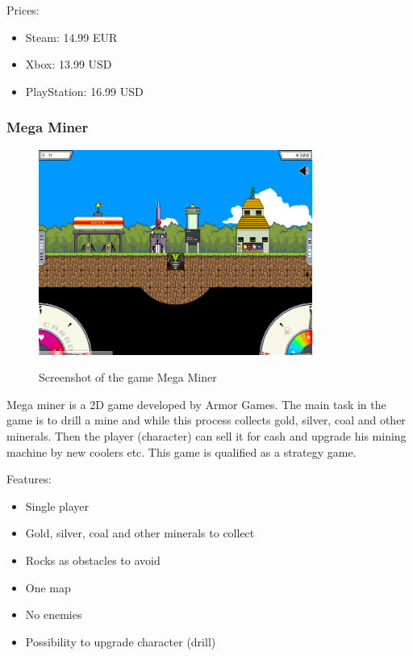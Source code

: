 \documentclass[12p]{article}
\begin{document}
Prices:

\begin{itemize}
  \item Steam: 14.99 EUR
  \item Xbox: 13.99 USD
  \item PlayStation: 16.99 USD
\end{itemize}


\subsubsection{Mega Miner}

\begin{figure}[ht]
  \center
  \includegraphics[width=0.8\textwidth]{StateOfTheArtScreenshots/mega_miner}
  \label{StateOfTheArt_Screenshots_MegaMiner}
  \caption{Screenshot of the game Mega Miner \cite{MegaMinerScreenshot}}
\end{figure}

Mega miner is a 2D game developed by Armor Games. The main task in the game is to drill a mine and while this process collects gold, silver, coal and other minerals. Then the player (character) can sell it for cash and upgrade his mining machine by new coolers etc. This game is qualified as a strategy game.

Features:

\begin{itemize}
  \item Single player
  \item Gold, silver, coal and other minerals to collect
  \item Rocks as obstacles to avoid
  \item One map
  \item No enemies
  \item Possibility to upgrade character (drill)
\end{itemize}
\end{document}
